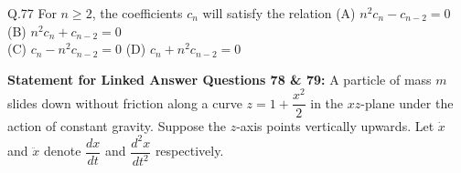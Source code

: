 \documentclass{article}
\begin{document}
																																																																																																																				    Q.77 \quad For $n \geq 2$, the coefficients $c_n$ will satisfy the relation
																																																																																																																				    \vspace{1em} \newline 
																																																																																																																				    (A) $n^2 c_n - c_{n-2} = 0$ \hspace{2cm} (B) $n^2 c_n + c_{n-2} = 0$ \hspace{2cm} \\ (C) $c_n - n^2 c_{n-2} = 0$ \hspace{2cm} (D) $c_n + n^2 c_{n-2} = 0$
																																																																																																																				    \vspace{1em} \newline

																																																																																																																				    \textbf{Statement for Linked Answer Questions 78 \& 79:} 
																																																																																																																				    \newline \vspace{1em}
																																																																																																																				    A particle of mass $m$ slides down without friction along a curve $z = 1 + \dfrac{x^2}{2}$ in the $xz$-plane under the action of constant gravity. Suppose the $z$-axis points vertically upwards. Let $\dot{x}$ and $\ddot{x}$ denote $\dfrac{dx}{dt}$ and $\dfrac{d^2x}{dt^2}$ respectively.
\end{document}

